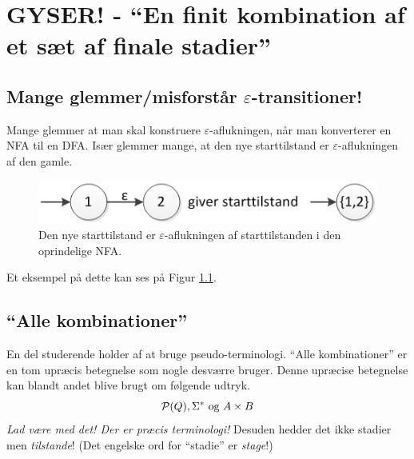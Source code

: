 \documentclass[a4paper,10pt,article]{memoir}
\begin{document}
\chapter{GYSER! - ``En finit kombination af et s{\ae}t af finale stadier''}

\section{Mange glemmer/misforstår $\varepsilon$-transitioner!}

Mange glemmer at man skal konstruere $\varepsilon$-aflukningen, når man konverterer en NFA til en DFA. Især glemmer mange, at den nye starttilstand er $\varepsilon$-aflukningen af den gamle.

\begin{figure}[h]
\centering
\includegraphics[scale=0.8]{figur12.png}
\caption{Den nye starttilstand er $\varepsilon$-aflukningen af starttilstanden i den oprindelige NFA.}
\label{fig:12}
\end{figure}

Et eksempel på dette kan ses på Figur \ref{fig:12}.

\section{``Alle kombinationer''}

En del studerende holder af at bruge pseudo-terminologi. ``Alle kombinationer'' er en tom upræcis betegnelse som nogle desværre bruger. Denne upræcise betegnelse kan blandt andet blive brugt om følgende udtryk.
%
\[ \mathcal{P}(Q), \Sigma^{\ast} \text{ og } A \times B \]
%
\emph{Lad være med det! Der er præcis terminologi!} Desuden hedder det ikke stadier men \emph{tilstande}! (Det engelske ord for ``stadie'' er \emph{stage}!)
\end{document}
